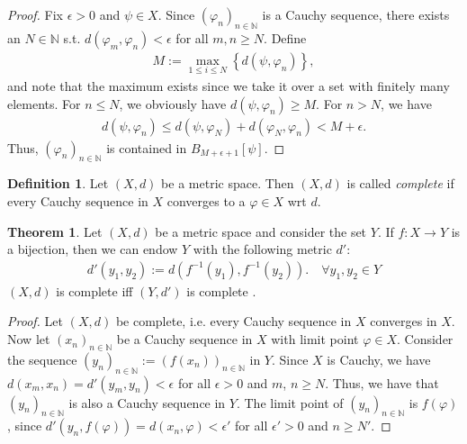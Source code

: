 \documentclass[12pt, a4paper]{article}
\numberwithin{equation}{section}
\theoremstyle{definition}
\theoremstyle{definition}
\newtheorem{defn}[thm]{Definition} %
\newtheorem{theorem}[thm]{Theorem}
\newcommand{\seq}[1][\varphi]{\left( #1 \right)_{n \in \mathbb{N}}}
\begin{document}
	\begin{proof}
		Fix $\epsilon > 0$ and $\psi\in X$. Since $\seq[\varphi_n]$ is a Cauchy sequence, there exists an $N\in\mathbb N$ s.t. $d(\varphi_m, \varphi_n) <\epsilon$ for all $m, n\geq N$. Define
		\begin{align}
			M := \max_{1\leq i\leq N}\left\{ d(\psi, \varphi_n) \right\}, 
		\end{align}
		and note that the maximum exists since we take it over a set with finitely many elements. For $n\leq N$, we obviously have $d(\psi, \varphi_n)\geq M$. For $n > N$, we have
		\begin{align*}
			d(\psi, \varphi_n) \leq d(\psi, \varphi_N) + d(\varphi_N, \varphi_n) < M + \epsilon.
		\end{align*}
		Thus, $\seq[\varphi_n]$ is contained in $B_{M + \epsilon + 1}[\psi]$.
	\end{proof}

	\begin{defn}
		Let $(X, d)$ be a metric space. Then $(X, d)$ is called \textit{complete} if every Cauchy sequence in $X$ converges to a $\varphi\in X$ wrt $d$.
	\end{defn}
	
	\begin{theorem}
		Let $(X, d)$ be a metric space and consider the set $Y$. If $f: X\to Y$ is a bijection, then we can endow $Y$ with the following metric $d'$:
		\begin{align}\label{eq:metrics_completion}
			d'(y_1, y_2) := d\left(f^{-1}(y_1), f^{-1}(y_2)\right). \quad \forall y_1, y_2\in Y
		\end{align}
		$(X, d)$ is complete iff $(Y, d')$ is complete \cite{3789234}.
	\end{theorem}
	
	\begin{proof}
		Let $(X, d)$ be complete, i.e. every Cauchy sequence in $X$ converges in $X$. Now let $(x_n)_{n\in\mathbb N}$ be a Cauchy sequence in $X$ with limit point $\varphi\in X$. Consider the sequence $(y_n)_{n\in\mathbb N} := \left(f(x_n)\right)_{n\in\mathbb N}$ in $Y$. Since $X$ is Cauchy, we have $ d(x_m, x_n) = d'(y_m, y_n) < \epsilon$ for all $\epsilon > 0$ and $m$, $n\geq N$. Thus, we have that $(y_{n})_{n\in\mathbb N}$ is also a Cauchy sequence in $Y$. The limit point of $\left(y_n\right)_{n\in\mathbb N}$ is $f(\varphi)$, since $d'(y_n, f(\varphi)) = d(x_n, \varphi) < \epsilon'$ for all $\epsilon' > 0$ and $n\geq N'$.
	\end{proof}
\end{document}
